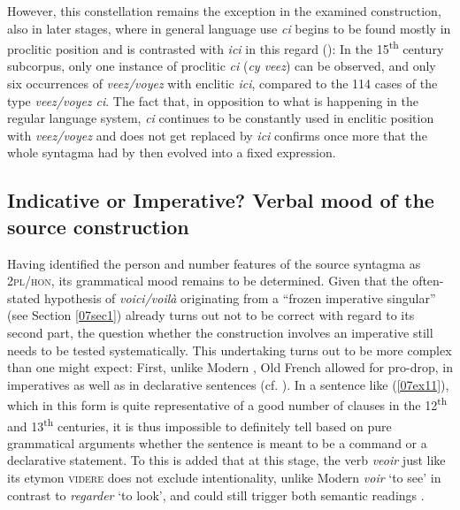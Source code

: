 \documentclass[output=paper,colorlinks,citecolor=brown]{langscibook}
\begin{document}
However, this constellation remains the exception in the examined  construction, also in later stages, where in general language use \emph{ci} begins to be found mostly in proclitic position and is contrasted with \emph{ici} in this regard (\citealt[vol. 4, 425]{few1922}): In the 15\textsuperscript{th} century subcorpus, only one instance of proclitic \emph{ci} (\emph{cy veez}) can be observed, and only six occurrences of \emph{veez/voyez} with enclitic \emph{ici}, compared to the 114 cases of the type \emph{veez/voyez ci}. The fact that, in opposition to what is happening in the regular  language system, \emph{ci} continues to be constantly used in enclitic position with \emph{veez/voyez} and does not get replaced by \emph{ici} confirms once more that the whole syntagma had by then evolved into a fixed expression.

\subsection{Indicative or Imperative? Verbal mood of the source construction} \label{07sec3.2}

Having identified the person and number features of the source syntagma as \textsc{2pl/hon}, its grammatical mood remains to be determined. Given that the often-stated hypothesis of \emph{voici/voilà} originating from a ``frozen imperative singular'' (see Section \ref{07sec1}) already turns out not to be correct with regard to its second part, the question whether the construction involves an imperative still needs to be tested systematically. This undertaking turns out to be more complex than one might expect: First, unlike Modern , Old French allowed for pro-drop, in imperatives as well as in declarative sentences (cf. \citealt{adams1987}). In a sentence like (\ref{07ex11}), which in this form is quite representative of a good number of  clauses in the 12\textsuperscript{th} and 13\textsuperscript{th} centuries, it is thus impossible to definitely tell based on pure grammatical arguments whether the sentence is meant to be a command or a declarative statement. To this is added that at this stage, the verb \emph{veoir} just like its  etymon \textsc{videre} does not exclude intentionality, unlike Modern  \emph{voir} `to see' in contrast to \emph{regarder} `to look', and could still trigger both semantic readings \citep[212]{iliescu2010}.
\end{document}
